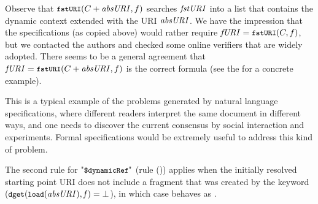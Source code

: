 \begin{remark}\label{rem:nodynref}
Observe that $\mbox{\tt{\small fstURI}}(C+\mathit{absURI},f)$ searches $\mathit{fstURI}$ into a list that contains the dynamic context
extended with the URI $\mathit{absURI}$. We have the impression that the specifications (as copied above) would rather
require $\mathit{fURI} = \mbox{\tt{\small fstURI}}(C,f)$, but we contacted the authors and checked some online 
verifiers that are widely adopted. There seems to be a general agreement that $\mathit{fURI} = \mbox{\tt{\small fstURI}}(C+\mathit{absURI},f)$
is the correct formula (see the {\FV} for a concrete example).

This is a typical example of the problems generated by natural language specifications, where different readers interpret
the same document in different ways, and one needs to discover the current consensus by social interaction and
experiments.
Formal specifications would be extremely useful to address this kind of problem.
%
\end{remark}

The second rule for $\qddref$ (rule (\rddref{})) applies when the initially resolved starting point URI does not include a fragment that was created by the 
{\qdda} keyword ($\mbox{\tt{\small dget}}(\mbox{\tt{\small load}}(\mathit{absURI}),\mathit{f}) = \bot$), 
in which case {\qddref} behaves as {\qdref}. 





